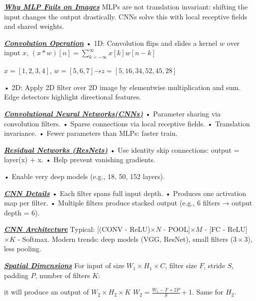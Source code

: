 \documentclass[10pt]{article}
\newcommand{\bulletPoint}[1]{\ul{\textit{\textbf{#1}}}}
\begin{document}
\begin{multicols*}{3}
\bulletPoint{Why MLP Fails on Images} \quad
MLPs are not translation invariant: shifting the input changes the output drastically. CNNs solve this with local receptive fields and shared weights.

\bulletPoint{Convolution Operation} \quad
• 1D: Convolution flips and slides a kernel $w$ over input $x$,
$(x * w)[n] = \sum_{k=-\infty}^{\infty} x[k] w[n-k]$

$x = [1, 2, 3, 4]$, $w = [5, 6, 7]$→$z = [5, 16, 34, 52, 45, 28]$

• 2D: Apply 2D filter over 2D image by elementwise multiplication and sum. Edge detectors highlight directional features.

\bulletPoint{Convolutional Neural Networks(CNNs)} \quad
• Parameter sharing via convolution filters. 
• Sparse connections via local receptive fields. 
• Translation invariance. 
• Fewer parameters than MLPs: faster train.






\bulletPoint{Residual Networks (ResNets)} \quad
• Use identity skip connections: output = layer(x) + x. \quad
• Help prevent vanishing gradients. \quad

• Enable very deep models (e.g., 18, 50, 152 layers).

\bulletPoint{CNN Details} \quad
• Each filter spans full input depth. \quad
• Produces one activation map per filter. \quad
• Multiple filters produce stacked output (e.g., 6 filters → output depth = 6). 

\bulletPoint{CNN Architecture} \quad
Typical: [(CONV - ReLU)$\times N$ - POOL]$\times M$ - [FC - ReLU]$\times K$ - Softmax. \quad
Modern trends: deep models (VGG, ResNet), small filters ($3\times3$), less pooling.


\bulletPoint{Spatial Dimensions} \quad
For input of size $W_1 \times H_1 \times C$, filter size $F$, stride $S$, padding $P$, number of filters $K$:

it will produce an output of $W_2 \times H_2 \times K$
$W_2 = \frac{W_1 - F + 2P}{S} + 1$. Same for $H_2$. 


\end{multicols*}
\end{document}
